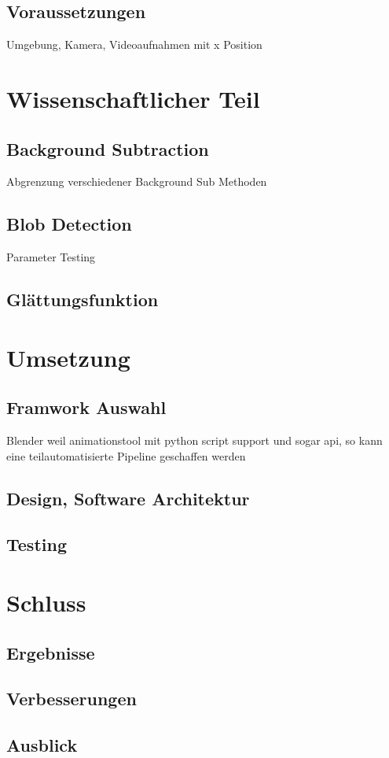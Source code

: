 \documentclass[11pt,a4paper,oldfontcommands]{memoir}
\begin{document}
\section{Voraussetzungen}
Umgebung, Kamera, Videoaufnahmen mit x Position

\chapter{Wissenschaftlicher Teil}
\section{Background Subtraction}
Abgrenzung verschiedener Background Sub Methoden
\section{Blob Detection}
Parameter Testing
\section{Glättungsfunktion}

\chapter{Umsetzung}
\section{Framwork Auswahl}
Blender weil animationstool mit python script support und sogar api, so kann eine teilautomatisierte Pipeline geschaffen werden
\section{Design, Software Architektur}
\section{Testing}

\chapter{Schluss}
\section{Ergebnisse}
\section{Verbesserungen}
\section{Ausblick}





\end{document}
